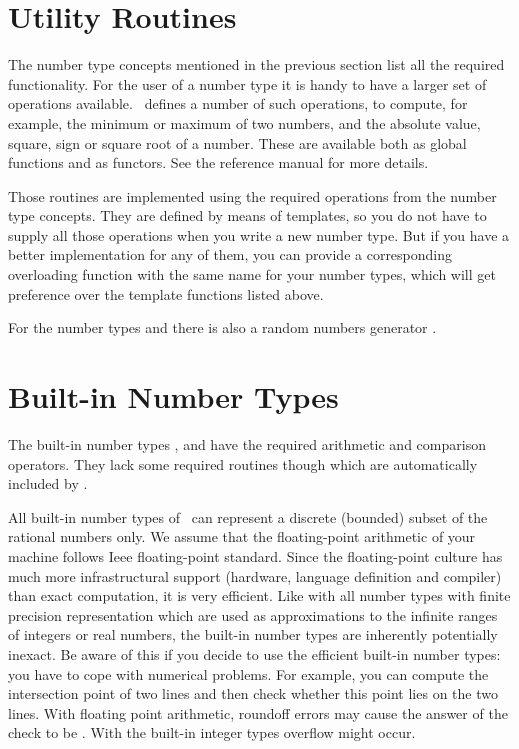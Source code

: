 \section{Utility Routines}

The number type concepts mentioned in the previous section list all 
the required functionality.
For the user of a number type it is handy to have a larger set of
operations available. \cgal\ defines a number of such operations,
to compute, for example, the minimum or maximum of two numbers, and the
absolute value, square, sign or square root of a number.  These are
available both as global functions and as functors.  See the reference
manual for more details.

Those routines are implemented using the required operations from the
number type concepts. They are defined by means of templates, so you do not
have to supply all those operations when you write  a new number type.
But if you have a better implementation for any of them, you can provide a 
corresponding overloading function with the same name for your number types,
which will get preference over the template functions listed above.

For the number types  and  there is
also a random numbers generator .

\section{Built-in Number Types}

The built-in number types ,  and  have
the required arithmetic and comparison operators. They lack some required
routines though which are automatically included by \cgal.

All built-in number types of \CC\ can represent a discrete (bounded)
subset of the rational numbers only.  We assume that the
floating-point arithmetic of your machine follows {\sc Ieee}
floating-point standard.  Since the floating-point culture has much
more infrastructural support (hardware, language definition and
compiler) than exact computation, it is very efficient.
Like with all number types with finite precision representation
which are used as approximations to the infinite ranges of 
integers or real numbers, the built-in number types are inherently
potentially inexact.
Be aware of this if you decide to use the efficient built-in 
number types: you have to cope with numerical problems.  
For example, you can compute the intersection point of two lines and 
then check whether this point lies on the two lines. 
With floating point arithmetic,
roundoff errors may cause the answer of the check to be . 
With the built-in integer types overflow might occur.

